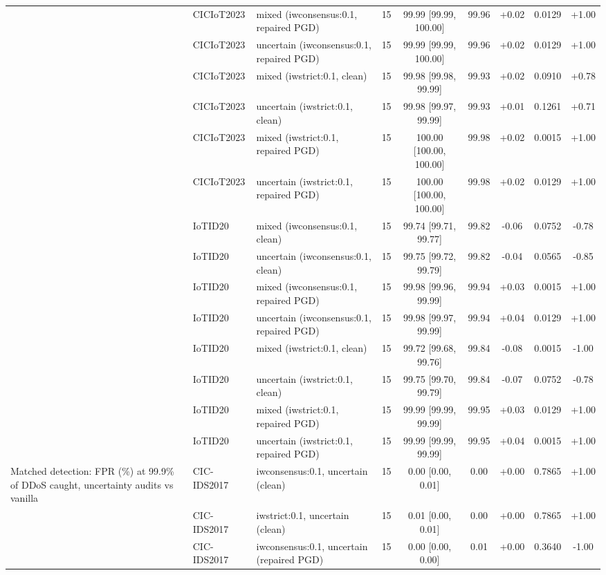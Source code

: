 \begin{table}[t]
\begin{tabular}{lllcccccc}
 & CICIoT2023 & mixed (iwconsensus:0.1, repaired PGD) & 15 & 99.99 [99.99, 100.00] & 99.96 & +0.02 & 0.0129 & +1.00 \\
 & CICIoT2023 & uncertain (iwconsensus:0.1, repaired PGD) & 15 & 99.99 [99.99, 100.00] & 99.96 & +0.02 & 0.0129 & +1.00 \\
 & CICIoT2023 & mixed (iwstrict:0.1, clean) & 15 & 99.98 [99.98, 99.99] & 99.93 & +0.02 & 0.0910 & +0.78 \\
 & CICIoT2023 & uncertain (iwstrict:0.1, clean) & 15 & 99.98 [99.97, 99.99] & 99.93 & +0.01 & 0.1261 & +0.71 \\
 & CICIoT2023 & mixed (iwstrict:0.1, repaired PGD) & 15 & 100.00 [100.00, 100.00] & 99.98 & +0.02 & 0.0015 & +1.00 \\
 & CICIoT2023 & uncertain (iwstrict:0.1, repaired PGD) & 15 & 100.00 [100.00, 100.00] & 99.98 & +0.02 & 0.0129 & +1.00 \\
 & IoTID20 & mixed (iwconsensus:0.1, clean) & 15 & 99.74 [99.71, 99.77] & 99.82 & -0.06 & 0.0752 & -0.78 \\
 & IoTID20 & uncertain (iwconsensus:0.1, clean) & 15 & 99.75 [99.72, 99.79] & 99.82 & -0.04 & 0.0565 & -0.85 \\
 & IoTID20 & mixed (iwconsensus:0.1, repaired PGD) & 15 & 99.98 [99.96, 99.99] & 99.94 & +0.03 & 0.0015 & +1.00 \\
 & IoTID20 & uncertain (iwconsensus:0.1, repaired PGD) & 15 & 99.98 [99.97, 99.99] & 99.94 & +0.04 & 0.0129 & +1.00 \\
 & IoTID20 & mixed (iwstrict:0.1, clean) & 15 & 99.72 [99.68, 99.76] & 99.84 & -0.08 & 0.0015 & -1.00 \\
 & IoTID20 & uncertain (iwstrict:0.1, clean) & 15 & 99.75 [99.70, 99.79] & 99.84 & -0.07 & 0.0752 & -0.78 \\
 & IoTID20 & mixed (iwstrict:0.1, repaired PGD) & 15 & 99.99 [99.99, 99.99] & 99.95 & +0.03 & 0.0129 & +1.00 \\
 & IoTID20 & uncertain (iwstrict:0.1, repaired PGD) & 15 & 99.99 [99.99, 99.99] & 99.95 & +0.04 & 0.0015 & +1.00 \\
Matched detection: FPR (\%) at 99.9\% of DDoS caught, uncertainty audits vs vanilla & CIC-IDS2017 & iwconsensus:0.1, uncertain (clean) & 15 & 0.00 [0.00, 0.01] & 0.00 & +0.00 & 0.7865 & +1.00 \\
 & CIC-IDS2017 & iwstrict:0.1, uncertain (clean) & 15 & 0.01 [0.00, 0.01] & 0.00 & +0.00 & 0.7865 & +1.00 \\
 & CIC-IDS2017 & iwconsensus:0.1, uncertain (repaired PGD) & 15 & 0.00 [0.00, 0.00] & 0.01 & +0.00 & 0.3640 & -1.00 \\

\end{tabular}
\end{table}
